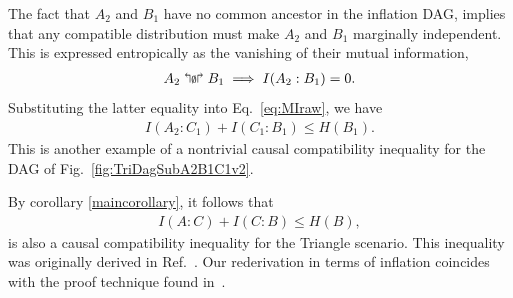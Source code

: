 The fact that $A_2$ and $B_1$ have no common ancestor in the inflation DAG, implies that any compatible distribution must make $A_2$ and $B_1$ marginally independent.  This is expressed entropically as the vanishing of their mutual information, 
\begin{align}\label{entropicfact}
A_2 \mathrel{\mathopen{\Lsh}{\scriptstyle\emptyset}\mathclose{\Rsh}} B_1 \implies  I(A_2 : B_1)  =0.
\end{align}
Substituting the latter equality into Eq.~\eqref{eq:MIraw}, we have
\begin{align}
	I(A_2 : C_1) + I(C_1 : B_1)  \leq H(B_1).
\end{align}
This is another example of a nontrivial causal compatibility inequality for the DAG of Fig.~\ref{fig:TriDagSubA2B1C1v2}.  

By corollary \ref{maincorollary}, it follows that 
\begin{align}\label{eq:monogomyofcorrelations}
	I(A : C) + I(C : B) \leq H(B),
\end{align}
is also a causal compatibility inequality for the Triangle scenario.  This inequality was originally derived in Ref.~\cite{fritz2012bell}. Our rederivation in terms of inflation coincides with the proof technique found in~\citet{pusey2014gdag}.



